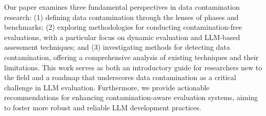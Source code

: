 
Our paper examines three fundamental perspectives in data contamination research: (1) defining data contamination through the lenses of phases and benchmarks; (2) exploring methodologies for conducting contamination-free evaluations, with a particular focus on dynamic evaluation and LLM-based assessment techniques; and (3) investigating methods for detecting data contamination, offering a comprehensive analysis of existing techniques and their limitations. This work serves as both an introductory guide for researchers new to the field and a roadmap that underscores data contamination as a critical challenge in LLM evaluation. Furthermore, we provide actionable recommendations for enhancing contamination-aware evaluation systems, aiming to foster more robust and reliable LLM development practices.